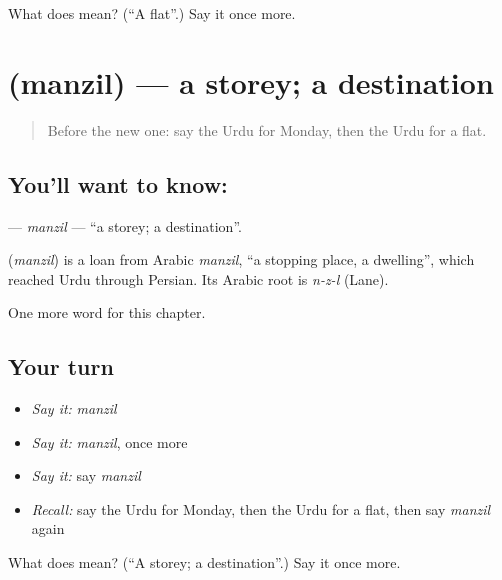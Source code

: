 \begin{tcolorbox}[breakable,colback=teal!4,colframe=teal!35!black,title={Before you move on}]
What does  mean? (\textquotedblleft{}A flat\textquotedblright{}.) Say it once more.
\end{tcolorbox}
\section[\texorpdfstring{\ur{منزل} (manzil)}{منزل (manzil)}]{ (manzil) — a storey; a destination}

\label{lesson:UR-C219-manzil}



\begin{quote}
Before the new one: say the Urdu for Monday, then the Urdu for a flat.
\end{quote}

\subsection*{You'll want to know: }
\textbf{} — \emph{manzil} — \textquotedblleft{}a storey; a destination\textquotedblright{}.

\begin{cousinweb}
\textbf{} (\emph{manzil}) is a loan from Arabic \emph{manzil}, \textquotedblleft{}a stopping place, a dwelling\textquotedblright{}, which reached Urdu through Persian. Its Arabic root is \emph{n-z-l} (Lane).
\end{cousinweb}

\begin{grammarlens}[title={What you've built}]
One more word for this chapter.
\end{grammarlens}

\subsection*{Your turn}
\begin{itemize}
\raggedright
  \item \emph{Say it:} \emph{manzil}
  \item \emph{Say it:} \emph{manzil}, once more
  \item \emph{Say it:} say \emph{manzil}
  \item \emph{Recall:} say the Urdu for Monday, then the Urdu for a flat, then say \emph{manzil} again
\end{itemize}

\begin{tcolorbox}[breakable,colback=teal!4,colframe=teal!35!black,title={Before you move on}]
What does  mean? (\textquotedblleft{}A storey; a destination\textquotedblright{}.) Say it once more.
\end{tcolorbox}
